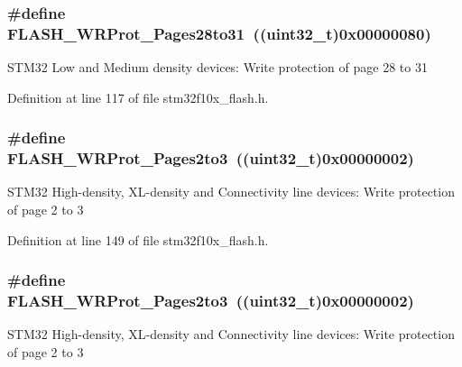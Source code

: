 \subsubsection[{\texorpdfstring{F\+L\+A\+S\+H\+\_\+\+W\+R\+Prot\+\_\+\+Pages28to31}{FLASH_WRProt_Pages28to31}}]{\setlength{\rightskip}{0pt plus 5cm}\#define F\+L\+A\+S\+H\+\_\+\+W\+R\+Prot\+\_\+\+Pages28to31~(({\bf uint32\+\_\+t})0x00000080)}\hypertarget{group___option___bytes___write___protection_ga800860d071cfb40b1b0e94111a0cb549}{}\label{group___option___bytes___write___protection_ga800860d071cfb40b1b0e94111a0cb549}
S\+T\+M32 Low and Medium density devices\+: Write protection of page 28 to 31 

Definition at line 117 of file stm32f10x\+\_\+flash.\+h.

\subsubsection[{\texorpdfstring{F\+L\+A\+S\+H\+\_\+\+W\+R\+Prot\+\_\+\+Pages2to3}{FLASH_WRProt_Pages2to3}}]{\setlength{\rightskip}{0pt plus 5cm}\#define F\+L\+A\+S\+H\+\_\+\+W\+R\+Prot\+\_\+\+Pages2to3~(({\bf uint32\+\_\+t})0x00000002)}\hypertarget{group___option___bytes___write___protection_gaeeb592e66053dde68ebb3ff3926d033d}{}\label{group___option___bytes___write___protection_gaeeb592e66053dde68ebb3ff3926d033d}
S\+T\+M32 High-\/density, X\+L-\/density and Connectivity line devices\+: Write protection of page 2 to 3 

Definition at line 149 of file stm32f10x\+\_\+flash.\+h.

\subsubsection[{\texorpdfstring{F\+L\+A\+S\+H\+\_\+\+W\+R\+Prot\+\_\+\+Pages2to3}{FLASH_WRProt_Pages2to3}}]{\setlength{\rightskip}{0pt plus 5cm}\#define F\+L\+A\+S\+H\+\_\+\+W\+R\+Prot\+\_\+\+Pages2to3~(({\bf uint32\+\_\+t})0x00000002)}\hypertarget{group___option___bytes___write___protection_gaeeb592e66053dde68ebb3ff3926d033d}{}\label{group___option___bytes___write___protection_gaeeb592e66053dde68ebb3ff3926d033d}
S\+T\+M32 High-\/density, X\+L-\/density and Connectivity line devices\+: Write protection of page 2 to 3 

